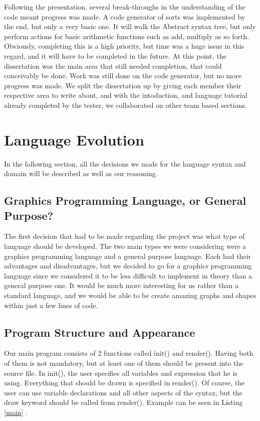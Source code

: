 \documentclass{l3proj}
\begin{document}
Following the presentation, several break-throughs in the understanding of the code meant progress was made. A code generator of sorts was implemented by the end, but only a very basic one. It will walk the Abstract syntax tree, but only perform actions for basic arithmetic functions such as add, multiply as so forth. Obviously, completing this is a high priority, but time was a huge issue in this regard, and it will have to be completed in the future. At this point, the dissertation was the main area that still needed completion, that could conceivably be done. Work was still done on the code generator, but no more progress was made. We split the dissertation up by giving each member their respective area to write about, and with the intoduction, and language tutorial already completed by the tester, we collaborated on other team based sections.



\chapter{Language Evolution}
\label{evo}
In the following section, all the decisions we made for the language syntax and domain will be described as well as our reasoning. 

\section{Graphics Programming Language, or General Purpose?}
The first decision that had to be made regarding the project was what type of language should be developed. The two main types we were considering were a graphics programming language and a general purpose language. Each had their advantages and disadvantages, but we decided to go for a graphics programming language since we considered it to be less difficult to implement in theory than a general purpose one. It would be much more interesting for us rather than a standard language, and we would be able to be create amazing graphs and shapes within just a few lines of code.  

\section {Program Structure and Appearance}
Our main program consists of 2 functions called init() and render(). Having both of them is not mandatory, but at least one of them should be present into the source file. In init(), the user specifies all variables and expression that he is using. Everything that should be drawn is specified in render(). Of course, the user can use variable declarations and all other aspects of the syntax, but the draw keyword should be called from render(). Example can be seen in Listing \ref{main} .
\end{document}

